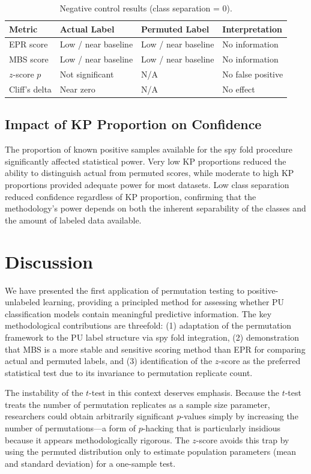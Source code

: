 \documentclass[12pt]{article}
\begin{document}
\begin{table}[ht]
\centering
\caption{Negative control results (class separation = 0).}
\label{tab:negative_control}
\begin{tabular}{llll}
\toprule
Metric & Actual Label & Permuted Label & Interpretation \\
\midrule
EPR score & Low / near baseline & Low / near baseline & No information \\
MBS score & Low / near baseline & Low / near baseline & No information \\
$z$-score $p$ & Not significant & N/A & No false positive \\
Cliff's delta & Near zero & N/A & No effect \\
\bottomrule
\end{tabular}
\end{table}

\subsection{Impact of KP Proportion on Confidence}

The proportion of known positive samples available for the spy fold procedure significantly affected statistical power. Very low KP proportions reduced the ability to distinguish actual from permuted scores, while moderate to high KP proportions provided adequate power for most datasets. Low class separation reduced confidence regardless of KP proportion, confirming that the methodology's power depends on both the inherent separability of the classes and the amount of labeled data available.

\section{Discussion}

We have presented the first application of permutation testing to positive-unlabeled learning, providing a principled method for assessing whether PU classification models contain meaningful predictive information. The key methodological contributions are threefold: (1) adaptation of the permutation framework to the PU label structure via spy fold integration, (2) demonstration that MBS is a more stable and sensitive scoring method than EPR for comparing actual and permuted labels, and (3) identification of the $z$-score as the preferred statistical test due to its invariance to permutation replicate count.

The instability of the $t$-test in this context deserves emphasis. Because the $t$-test treats the number of permutation replicates as a sample size parameter, researchers could obtain arbitrarily significant $p$-values simply by increasing the number of permutations---a form of $p$-hacking that is particularly insidious because it appears methodologically rigorous. The $z$-score avoids this trap by using the permuted distribution only to estimate population parameters (mean and standard deviation) for a one-sample test.
\end{document}
